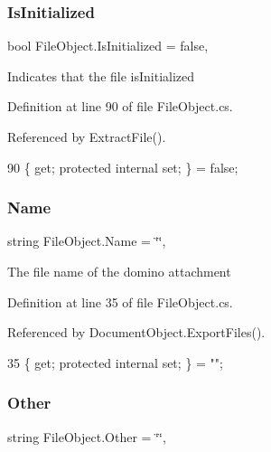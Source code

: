 \subsubsection{\texorpdfstring{Is\+Initialized}{IsInitialized}}
{\footnotesize\ttfamily bool File\+Object.\+Is\+Initialized = false\hspace{0.3cm}{\ttfamily [get]}, {\ttfamily [set]}}



Indicates that the file is\+Initialized 



Definition at line 90 of file File\+Object.\+cs.



Referenced by Extract\+File().


\begin{DoxyCode}
90 \{ \textcolor{keyword}{get}; \textcolor{keyword}{protected} \textcolor{keyword}{internal} \textcolor{keyword}{set}; \} = \textcolor{keyword}{false};
\end{DoxyCode}
\mbox{\label{class_file_object_a9d47aff166393cb47490da2661576d62}} 
\subsubsection{\texorpdfstring{Name}{Name}}
{\footnotesize\ttfamily string File\+Object.\+Name = \char`\"{}\char`\"{}\hspace{0.3cm}{\ttfamily [get]}, {\ttfamily [set]}}



The file name of the domino attachment 



Definition at line 35 of file File\+Object.\+cs.



Referenced by Document\+Object.\+Export\+Files().


\begin{DoxyCode}
35 \{ \textcolor{keyword}{get}; \textcolor{keyword}{protected} \textcolor{keyword}{internal} \textcolor{keyword}{set}; \} = \textcolor{stringliteral}{""};
\end{DoxyCode}
\mbox{\label{class_file_object_ab91b5eca56a04784f8d0187247e1280c}} 
\subsubsection{\texorpdfstring{Other}{Other}}
{\footnotesize\ttfamily string File\+Object.\+Other = \char`\"{}\char`\"{}\hspace{0.3cm}{\ttfamily [get]}, {\ttfamily [set]}}



